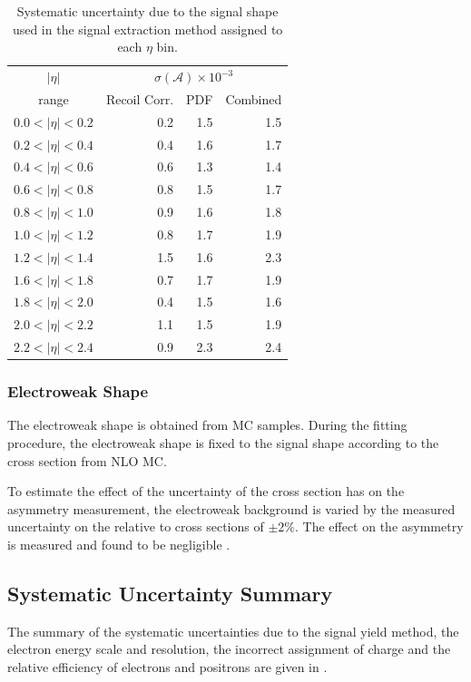 \begin{table}[htbp]
\begin{center}
\begin{tabular}{crrr}
\toprule
$|\eta|$  & \multicolumn{3}{c}{$\sigma(\mathcal{A}) \times 10^{-3}$}\\
range     & Recoil Corr.& PDF & Combined \\
\midrule
$0.0<|\eta|<0.2$ &  0.2 &  1.5  & 1.5 \\
$0.2<|\eta|<0.4$ &  0.4 &  1.6  & 1.7 \\
$0.4<|\eta|<0.6$ &  0.6 &  1.3  & 1.4 \\
$0.6<|\eta|<0.8$ &  0.8 &  1.5  & 1.7 \\
$0.8<|\eta|<1.0$ &  0.9 &  1.6  & 1.8 \\
$1.0<|\eta|<1.2$ &  0.8 &  1.7  & 1.9 \\
$1.2<|\eta|<1.4$ &  1.5 &  1.6  & 2.3 \\
$1.6<|\eta|<1.8$ &  0.7 &  1.7  & 1.9 \\
$1.8<|\eta|<2.0$ &  0.4 &  1.5  & 1.6 \\
$2.0<|\eta|<2.2$ &  1.1 &  1.5  & 1.9 \\
$2.2<|\eta|<2.4$ &  0.9 &  2.3  & 2.4 \\
\bottomrule
\end{tabular}
\caption[Systematic uncertainty due to the signal \MET shape used in the signal
extraction method.] {\label{tab:updatedsystsig} Systematic uncertainty due to
the signal \MET shape used in the signal extraction method assigned to each
$\eta$ bin\cite{bendavid2011electron}.}
\end{center}
\end{table}

\subsubsection{Electroweak \ETm Shape}

The {electroweak} \ETm shape is obtained from {MC} samples. During the fitting
procedure, the {electroweak} shape is fixed to the \Wenu signal shape according to
the cross section from NLO {MC}.

To estimate the effect of the uncertainty of the cross section has on the
asymmetry measurement, the {electroweak} background is varied by
the measured uncertainty on the relative \PW to \PZ cross sections of
$\pm2\%$. The effect on the asymmetry is measured and found to be
negligible \cite{bendavid2011electron}.

\subsection{Systematic Uncertainty Summary}
The summary of the systematic uncertainties due to the signal yield method, the
electron energy scale and resolution, the incorrect assignment of charge and the
relative efficiency of electrons and positrons are given in
.

